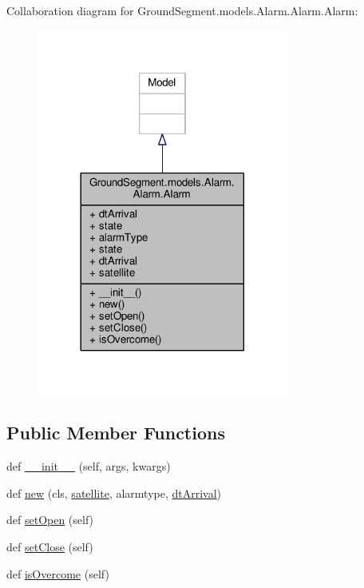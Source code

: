 Collaboration diagram for Ground\+Segment.\+models.\+Alarm.\+Alarm.\+Alarm\+:\nopagebreak
\begin{figure}[H]
\begin{center}
\leavevmode
\includegraphics[width=233pt]{class_ground_segment_1_1models_1_1_alarm_1_1_alarm_1_1_alarm__coll__graph}
\end{center}
\end{figure}
\subsection*{Public Member Functions}
\begin{DoxyCompactItemize}
\item 
def \hyperlink{class_ground_segment_1_1models_1_1_alarm_1_1_alarm_1_1_alarm_a2689d35e506c6fc25613bda35d1a0994}{\+\_\+\+\_\+init\+\_\+\+\_\+} (self, args, kwargs)
\item 
def \hyperlink{class_ground_segment_1_1models_1_1_alarm_1_1_alarm_1_1_alarm_a93e8b0cb1730a3afe7349d6b4c7a9153}{new} (cls, \hyperlink{class_ground_segment_1_1models_1_1_alarm_1_1_alarm_1_1_alarm_a605cb206ae2e10d3a552d9dd47f5ba58}{satellite}, alarmtype, \hyperlink{class_ground_segment_1_1models_1_1_alarm_1_1_alarm_1_1_alarm_a020cb3f0f8923b094ba710029d0dd433}{dt\+Arrival})
\item 
def \hyperlink{class_ground_segment_1_1models_1_1_alarm_1_1_alarm_1_1_alarm_a99cb5236d959b768b4aa99bdeed9b909}{set\+Open} (self)
\item 
def \hyperlink{class_ground_segment_1_1models_1_1_alarm_1_1_alarm_1_1_alarm_a5a8f40f21689e3f971da72697ec6ccdb}{set\+Close} (self)
\item 
def \hyperlink{class_ground_segment_1_1models_1_1_alarm_1_1_alarm_1_1_alarm_aab0965a0660e28177d0ed9e9893ccc41}{is\+Overcome} (self)
\end{DoxyCompactItemize}
